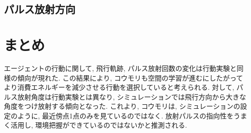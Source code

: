 \documentclass[../main]{subfiles}
\begin{document}
\subsection{パルス放射方向}

\section{まとめ}
エージェントの行動に関して, 飛行軌跡, 
パルス放射回数の変化は行動実験と同様の傾向が現れた.
この結果により,
コウモリも空間の学習が進むにしたがって
より消費エネルギーを減少させる行動を選択していると考えられる.
対して, パルス放射角度は行動実験とは異なり, 
シミュレーションでは飛行方向から大きな角度をつけ放射する傾向となった.
これより, コウモリは, シミュレーションの設定のように, 
最近傍点1点のみを見ているのではなく.
放射パルスの指向性をうまく活用し, 
環境把握ができているのではないかと推測される.

    
\end{document}
